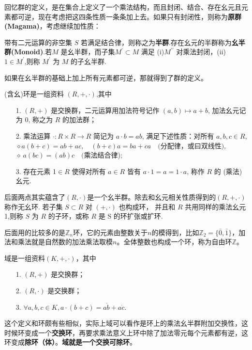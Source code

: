 回忆群的定义，是在集合上定义了一个乘法结构，而且封闭、结合、存在幺元且元素都可逆，现在考虑把这四条性质一条条加上去。如果只有封闭性，则称为\textbf{原群(Magama)}，考虑继续加性质：
\begin{definition}[半群与幺半群]
	带有二元运算的非空集 $S$ 若满足结合律，则称之为\textbf{半群}.存在幺元的半群称为\textbf{幺半群(Monoid)}.若$M$ 是幺半群，而子集$M^{\prime}\subset M$ 满足 (i)$M^{\prime\prime}$ 对乘法封闭，(ii) $1\in M^{\prime}$,则称 $M^{\prime}$ 为 $M$ 的子幺半群.
\end{definition}
如果在幺半群的基础上加上所有元素都可逆，那就得到了群的定义。
\begin{definition}
	(含幺)环是一组资料 $(R,+,\cdot)$,其中
	\begin{itemize}
		\item [1.]$(R,+)$ 是交换群，二元运算用加法符号记作 $(a,b)\mapsto a+b$, 加法幺元记为 0, 称之为 $R$ 的加法群；
		\item [2.]乘法运算 $\cdot:R\times R\to R$ 简记为 $a\cdot b=ab$, 满足下述性质：对所有 $a,b,c\in R$, $\diamond a( b+ c) = ab+ ac, \quad ( b+ c) a= ba+ ca\quad ( $分配律，或曰双线性$) , $
		$\diamond\:a(bc)=(ab)c\quad($乘法结合律);
		\item[3.]存在元素 1$\in R$ 使得对所有 $a\in R$ 皆有 $a\cdot1=a=1\cdot a$, 称作 $R$ 的 (乘法) 幺元.
	\end{itemize}
		后面两点其实蕴含了$(R,\cdot)$是一个幺半群。除去和幺元相关性质得到的$(R,+,\cdot)$ 称作无幺环. 若子集 $S\subset R$ 对 $(+,\cdot)$ 也构成环， 并且和 $R$ 共用同样的乘法幺元 1,则称 $S$ 为 $R$ 的子环，或称 $R$ 是 S 的环扩张或扩环.
\end{definition}
\begin{example}
	后面用的比较多的是$\mathbb{Z}_n$环，它的元素由整数关于$n$的模得到，比如$\mathbb{Z}_2=\{\bar 0,\bar 1\}$，加法和乘法就是自然数的加法乘法取模$n$。全体整数也构成一个环，称为自由环$\mathbb{Z}$。
\end{example}
\begin{definition}
	域是一组资料$(K,+,\cdot)$，其中
	\begin{itemize}
		\item [1.]$(R,+)$ 是交换群；
		\item [2.]$(R,\cdot)$ 是交换群；
		\item [3.]$\forall a,b,c\in K,a\cdot (b+c)=a\dot b+a\dot c$.
	\end{itemize}
	这个定义和环颇有些相似，实际上域可以看作是环上的乘法幺半群附加交换性，这时候环变成一个\textbf{交换环}，再要求乘法意义上环中除了加法零元每个元素都有逆，这环变成\textbf{除环（体）}。\textbf{域就是一个交换可除环}。
\end{definition}
